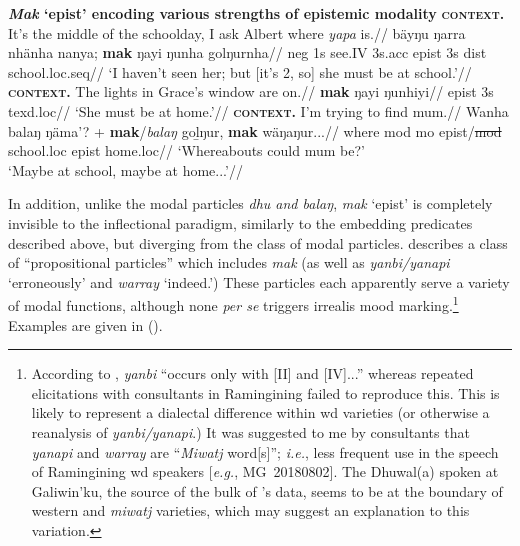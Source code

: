 	\pex\textbf{\textit{Mak} `\gls{epist}' encoding various strengths of epistemic modality}
	\a\begingl\glpreamble\textbf{\textsc{context}.} It's the middle of the schoolday, I ask Albert where \textit{yapa} is.//
	\gla bäyŋu ŋarra nhänha nanya; \textbf{mak} ŋayi ŋunha golŋurnha//
	\glb \gls{neg} 1s see.\gls{IV} 3s.\gls{acc} \gls{epist} 3s \gls{dist} school.\gls{loc}.\gls{seq}//
	\glft`I haven't seen her; but [it's 2, so] she must be at school.'\trailingcitation{[AW~20190429]}//\endgl
	\a\begingl\glpreamble\textbf{\textsc{context.}} The lights in Grace's window are on.//
	\gla \textbf{mak} ŋayi ŋunhiyi//
	\glb \gls{epist} 3s \gls{texd}.\gls{loc}//
	\glft`She must be at home.'\trailingcitation{[MG~20180802]}//\endgl
	\a\begingl\glpreamble\textbf{\textsc{context.}} I'm trying to find mum.//
	\gla Wanha balaŋ ŋäma'? + \textbf{mak}/\judge{$ {}^\# $}\textit{balaŋ} goḻŋur, \textbf{mak} wäŋaŋur...//
	\glb where \gls{mod} \gls{mo} \gls{epist}/\sout{\gls{mod}} school.\gls{loc} \gls{epist} home.\gls{loc}//
	\glft`Whereabouts could mum be?'\\`Maybe at school, maybe at home...'\trailingcitation{[AW~20190429]}//\endgl
	\xe
	
	
	
	In addition, unlike the modal particles \textit{dhu \textup{and} balaŋ}, \textit{mak} `\gls{epist}' is  completely invisible to the inflectional paradigm, similarly to the embedding predicates described above, but diverging from the class of modal particles. \citet[685]{Wilkinson1991} describes a class of ``propositional particles'' which includes \textit{mak} (as well as \textit{yanbi\slash{}yanapi} `erroneously' and \textit{warray} `indeed.') These particles each apparently serve a variety of modal functions, although none \textit{per se} triggers irrealis mood marking.\footnote{According to \citet[686]{Wilkinson1991}, \textit{yanbi} ``occurs only with [\gls{II}] and [\gls{IV}]...'' whereas repeated elicitations with consultants in Ramingining failed to reproduce this. This is likely to represent a dialectal difference within \gls{wd} varieties (or otherwise a reanalysis of \textit{yanbi\slash{}yanapi}.) It was suggested to me by consultants that \textit{yanapi} and \textit{warray} are ``\textit{Miwatj} word[s]''; \textit{i.e.}, less frequent use in the speech of Ramingining \gls{wd} speakers [\textit{e.g.}, MG~20180802]. The Dhuwal(a) spoken at Galiwin'ku, the source of the bulk of \citeauthor{Wilkinson1991}'s data, seems to be at the boundary of western and \textit{miwatj} varieties, which may suggest an explanation to this variation.} Examples are given in ().
	
